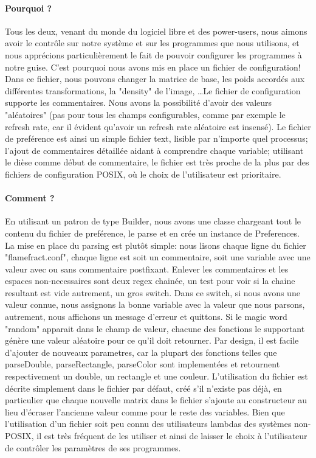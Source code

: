 \documentclass[a4paper]{report}
\begin{document}
\paragraph{Pourquoi ?}
Tous les deux, venant du monde du logiciel libre et des power-users, nous aimons avoir le contrôle sur notre système et sur les programmes que nous utilisons, et nous apprécions particulièrement le fait de pouvoir configurer les programmes à notre guise. C'est pourquoi nous avons mis en place un fichier de configuration! Dans ce fichier, nous pouvons changer la matrice de base, les poids accordés aux différentes transformations, la "density" de l'image, \ldots Le fichier de configuration supporte les commentaires. Nous avons la possibilité d'avoir des valeurs "aléatoires" (pas pour tous les champs configurables, comme par exemple le refresh rate, car il évident qu'avoir un refresh rate aléatoire est insensé). Le fichier de preférence est ainsi un simple fichier text, lisible par n'importe quel processus; l'ajout de commentaires détaillée aidant à comprendre chaque variable; utilisant le dièse comme début de commentaire, le fichier est très proche de la plus par des fichiers de configuration POSIX, où le choix de l'utilisateur est prioritaire.

\paragraph{Comment ?}
En utilisant un patron de type Builder, nous avons une classe chargeant tout le contenu du fichier de preférence, le parse et en crée un instance de Preferences. La mise en place du parsing est plutôt simple: nous lisons chaque ligne du fichier "flamefract.conf", chaque ligne est soit un commentaire, soit une variable avec une valeur avec ou sans commentaire postfixant. Enlever les commentaires et les espaces non-necessaires sont deux regex chainée, un test pour voir si la chaine resultant est vide autrement, un gros switch. Dans ce switch, si nous avons une valeur connue, nous assignons la bonne variable avec la valeur que nous parsons, autrement, nous affichons un message d'erreur et quittons. Si le magic word "random" apparait dans le champ de valeur, chacune des fonctions le supportant génère une valeur aléatoire pour ce qu'il doit retourner. Par design, il est facile d'ajouter de nouveaux parametres, car la plupart des fonctions telles que parseDouble, parseRectangle, parseColor sont implementées et retournent respectivement un double, un rectangle et une couleur. L'utilisation du fichier est décrite simplement dans le fichier par défaut, créé s'il n'existe pas déjà, en particulier que chaque nouvelle matrix dans le fichier s'ajoute au constructeur au lieu d'écraser l'ancienne valeur comme pour le reste des variables. Bien que l'utilisation d'un fichier soit peu connu des utilisateurs lambdas des systèmes non-POSIX, il est très fréquent de les utiliser et ainsi de laisser le choix à l'utilisateur de contrôler les paramètres de ses programmes.
\end{document}
